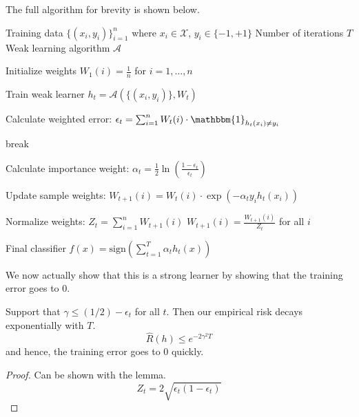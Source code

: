   \begin{algo}
    The full algorithm for brevity is shown below. 
    \begin{algorithm}[H]
      \label{alg:adaboost}
      \begin{algorithmic}[1]
        \Require Training data $\{(x_i, y_i)\}_{i=1}^n$ where $x_i \in \mathcal{X}$, $y_i \in \{-1, +1\}$
        \Require Number of iterations $T$
        \Require Weak learning algorithm $\mathcal{A}$

        \State Initialize weights $W_1(i) = \frac{1}{n}$ for $i = 1,\ldots,n$

          \State Train weak learner $h_t = \mathcal{A}(\{(x_i, y_i)\}, W_t)$
          
          \State Calculate weighted error:
          \State $\epsilon_t = \sum_{i=1}^n W_t(i) \cdot \mathbbm{1}_{h_t(x_i) \neq y_i}$
          
              \State break
          \EndIf
          
          \State Calculate importance weight:
          \State $\alpha_t = \frac{1}{2} \ln(\frac{1-\epsilon_t}{\epsilon_t})$
          
          \State Update sample weights:
              \State $W_{t+1}(i) = W_t(i) \cdot \exp(-\alpha_t y_i h_t(x_i))$
          \EndFor
          
          \State Normalize weights:
          \State $Z_t = \sum_{i=1}^n W_{t+1}(i)$
          \State $W_{t+1}(i) = \frac{W_{t+1}(i)}{Z_t}$ for all $i$
        \EndFor

        \State \Return Final classifier $f(x) = \text{sign}\left(\sum_{t=1}^T \alpha_t h_t(x)\right)$
      \end{algorithmic}
    \end{algorithm}
  \end{algo}

  We now actually show that this is a strong learner by showing that the training error goes to $0$. 

  \begin{theorem}
    \label{thm:exponential-decay-of-training-error-in-adaboost}
    Support that $\gamma \leq (1/2) - \epsilon_t$ for all $t$. Then our empirical risk decays exponentially with $T$. 
    \begin{equation}
      \hat{R} (h) \leq e^{-2 \gamma^2 T}
    \end{equation}
    and hence, the training error goes to $0$ quickly. 
  \end{theorem}
  \begin{proof}
    Can be shown with the lemma. 
    \begin{equation}
      Z_t = 2 \sqrt{\epsilon_t (1 - \epsilon_t)}
    \end{equation}
  \end{proof}

